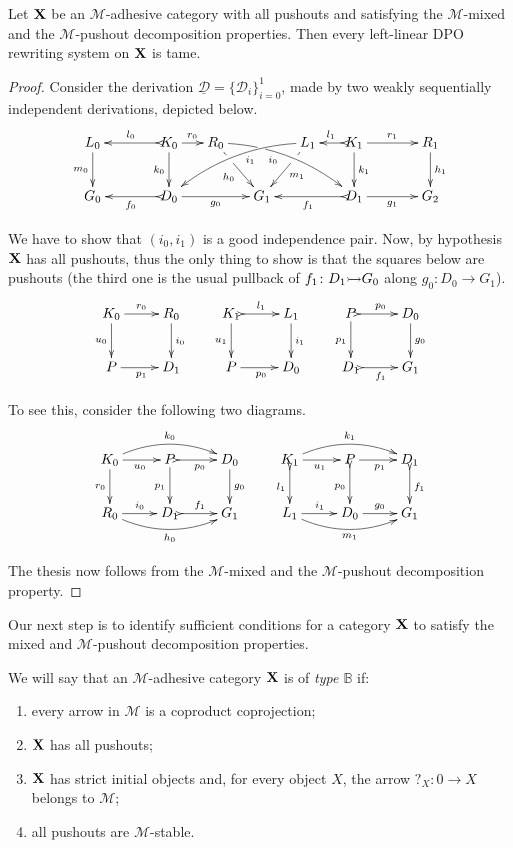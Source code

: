 \documentclass[a4paper,UKenglish,cleveref,pdftex, thm-restate,numberwithinsect]{lipics}
\newcommand{\mto}[0]{\scalebox{1}{$\rightarrowtail$}}
\def\X{\textbf {\textup{X}}}
\newcommand{\dder}[1]{\mathscr{#1}}
\newcommand{\der}[1]{\underline{\dder{#1}}}
\begin{document}
\begin{theorem}\label{thm:good1}Let $\X$ be an $\mathcal{M}$-adhesive category with all pushouts and satisfying the $\mathcal{M}$-mixed and the $\mathcal{M}$-pushout decomposition properties. Then every left-linear DPO rewriting system on $\X$ is tame.
\end{theorem}
\begin{proof} 
	Consider the derivation $\der{D}=\{\dder{D}_i\}_{i=0}^1$, made by two weakly sequentially independent derivations, depicted below.
	\[\xymatrix@C=15pt{L_0 \ar[d]_{m_0}&& K_0 \ar[d]_{k_0}\ar@{>->}[ll]_{l_0} \ar[r]^{r_0} & R_0 \ar@/^.35cm/[drrr]|(.3)\hole_(.4){i_0} \ar[dr]|(.3)\hole_{h_0} && L_1 \ar@/_.35cm/[dlll]^(.4){i_1} \ar[dl]|(.3)\hole^{m_1}& K_1 \ar[d]^{k_1}\ar@{>->}[l]_{l_1} \ar[rr]^{r_1} && R_1 \ar[d]^{h_1} \\G_0 && \ar@{>->}[ll]^{f_0} D_0 \ar[rr]_{g_0}&& G_1  && \ar@{>->}[ll]^{f_1} D_1 \ar[rr]_{g_1}&& G_2 }\]

We have to show that $(i_0, i_1)$ is a good independence pair. Now, by hypothesis $\X$ has all pushouts, thus the only thing to show is that the squares below are pushouts (the third one is the usual pullback of $f_1\colon D_1\mto G_0$ along $g_0\colon D_0\to G_1$).
			\[\xymatrix{K_0 \ar[r]^{r_0}  \ar[d]_{u_0}& R_0 \ar[d]^{i_0} & K_1 \ar@{>->}[r]^{l_1}  \ar[d]_{u_1}& L_1 \ar[d]^{i_1}&P \ar@{>->}[r]^{p_0} \ar[d]_{p_1}& D_0\ar[d]^{g_0} \\ P \ar[r]_{p_1} & D_1 &P \ar[r]_{p_0}  & D_0&D_1 \ar@{>->}[r]_{f_1} & G_1}\]

To see this, consider the following two diagrams.
\[\xymatrix{K_0 \ar@/^.4cm/[rr]^{k_0} \ar[d]_{r_0} \ar[r]_{u_0}& \ar@{>->}[r]_{p_0} P \ar[d]_{p_1}& D_0 \ar[d]^{g_0}&K_1 \ar@/^.4cm/[rr]^{k_1} \ar@{>->}[d]_{l_1} \ar[r]_{u_1}& \ar[r]_{p_1} P \ar@{>->}[d]_{p_0}& D_1 \ar@{>->}[d]^{f_1}\\ R_0 \ar@/_.4cm/[rr]_{h_0}  \ar[r]^{i_0}& D_1 \ar@{>->}[r]^{f_1}& G_1 &L_1 \ar@/_.4cm/[rr]_{m_1}  \ar[r]^{i_1}& D_0 \ar[r]^{g_0}& G_1}\]

The thesis now follows from the $\mathcal{M}$-mixed and the $\mathcal{M}$-pushout decomposition property.
\end{proof}

Our next step is to identify sufficient conditions for a category $\X$ to satisfy the mixed and $\mathcal{M}$-pushout decomposition properties.

\begin{definition}
We will say that an $\mathcal{M}$-adhesive category $\X$ is of \emph{type $\mathbb{B}$} if:
	\begin{enumerate}
		\item every arrow in $\mathcal{M}$ is a coproduct coprojection;
		\item $\X$ has all pushouts;
		\item $\X$ has strict initial objects and, for every object $X$, the arrow $?_X\colon 0\to X $ belongs to $\mathcal{M}$;
		\item all pushouts are $\mathcal{M}$-stable.
	\end{enumerate}
\end{definition}
\end{document}
